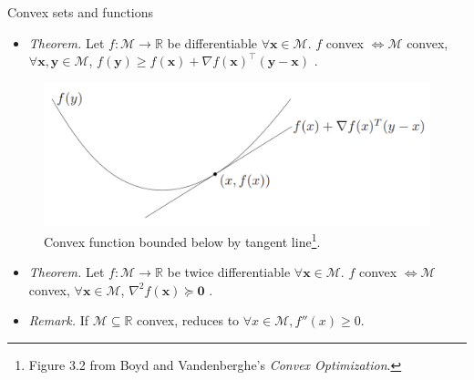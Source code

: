 \documentclass{beamer}
\numberwithin{equation}{section}
\begin{document}
\begin{frame}{Convex sets and functions}
    \begin{itemize}
        \item
        \textit{Theorem.} Let $ f : \mathcal{M} \rightarrow \mathbb{R} $ be
        differentiable $ \forall \mathbf{x} \in \mathcal{M} $. $ f $
        convex $ \Leftrightarrow \mathcal{M} $ convex, $ \forall \mathbf{x},
        \mathbf{y} \in \mathcal{M} $, $ f(\mathbf{y}) \ge f(\mathbf{x}) +
        \nabla f(\mathbf{x})^\top(\mathbf{y} - \mathbf{x}) $
        \cite{bv_convex_opt}.
    \end{itemize}
    \begin{figure}
        \centering
        \vspace{-5 pt}
        \includegraphics[scale = 0.3]{bv_fig_3.2.png}
        \vspace{-10 pt}
        \caption{Convex function bounded below by tangent line\footnote{
            Figure 3.2 from Boyd and Vandenberghe's
            \textit{Convex Optimization}.
        }. }
        \vspace{-15 pt}
    \end{figure}
    \begin{itemize}
        \item
        \textit{Theorem.} Let $ f : \mathcal{M} \rightarrow \mathbb{R} $ be
        twice differentiable $ \forall \mathbf{x} \in \mathcal{M} $.
        $ f $ convex $ \Leftrightarrow \mathcal{M} $ convex, $ \forall
        \mathbf{x} \in \mathcal{M} $, $ \nabla^2f(\mathbf{x}) \succeq
        \mathbf{0} $ \cite{bv_convex_opt}.

        \item
        \textit{Remark.} If $ \mathcal{M} \subseteq \mathbb{R} $ convex,
        reduces to $ \forall x \in \mathcal{M}, f''(x) \ge 0 $.
    \end{itemize}

    \medskip

\end{frame}
\end{document}
